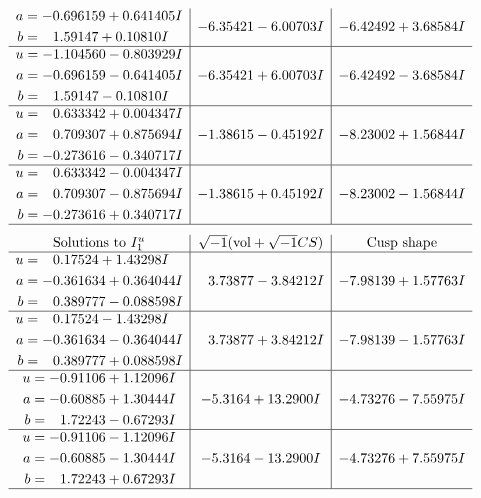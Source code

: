 \documentclass[1p]{elsarticle_modified}
\theoremstyle{definition}
\newcommand{\I}{\sqrt{-1}}
\begin{document}
$$\begin{array}{c|c|c}
\begin{aligned}
a &= -0.696159 + 0.641405 I \\
b &= \phantom{-}1.59147 + 0.10810 I\end{aligned}
 & -6.35421 - 6.00703 I & -6.42492 + 3.68584 I \\ \hline\begin{aligned}
u &= -1.104560 - 0.803929 I \\
a &= -0.696159 - 0.641405 I \\
b &= \phantom{-}1.59147 - 0.10810 I\end{aligned}
 & -6.35421 + 6.00703 I & -6.42492 - 3.68584 I \\ \hline\begin{aligned}
u &= \phantom{-}0.633342 + 0.004347 I \\
a &= \phantom{-}0.709307 + 0.875694 I \\
b &= -0.273616 - 0.340717 I\end{aligned}
 & -1.38615 - 0.45192 I & -8.23002 + 1.56844 I \\ \hline\begin{aligned}
u &= \phantom{-}0.633342 - 0.004347 I \\
a &= \phantom{-}0.709307 - 0.875694 I \\
b &= -0.273616 + 0.340717 I\end{aligned}
 & -1.38615 + 0.45192 I & -8.23002 - 1.56844 I\\
 \hline 
 \end{array}$$\newpage$$\begin{array}{c|c|c}  
\text{Solutions to }I^u_{1}& \I (\text{vol} + \sqrt{-1}CS) & \text{Cusp shape}\\
 \hline 
\begin{aligned}
u &= \phantom{-}0.17524 + 1.43298 I \\
a &= -0.361634 + 0.364044 I \\
b &= \phantom{-}0.389777 - 0.088598 I\end{aligned}
 & \phantom{-}3.73877 - 3.84212 I & -7.98139 + 1.57763 I \\ \hline\begin{aligned}
u &= \phantom{-}0.17524 - 1.43298 I \\
a &= -0.361634 - 0.364044 I \\
b &= \phantom{-}0.389777 + 0.088598 I\end{aligned}
 & \phantom{-}3.73877 + 3.84212 I & -7.98139 - 1.57763 I \\ \hline\begin{aligned}
u &= -0.91106 + 1.12096 I \\
a &= -0.60885 + 1.30444 I \\
b &= \phantom{-}1.72243 - 0.67293 I\end{aligned}
 & -5.3164 + 13.2900 I & -4.73276 - 7.55975 I \\ \hline\begin{aligned}
u &= -0.91106 - 1.12096 I \\
a &= -0.60885 - 1.30444 I \\
b &= \phantom{-}1.72243 + 0.67293 I\end{aligned}
 & -5.3164 - 13.2900 I & -4.73276 + 7.55975 I\\
 \hline 
 \end{array}$$\newpage\newpage\renewcommand{\arraystretch}{1}
\end{document}
